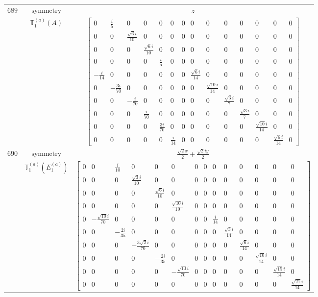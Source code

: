 \documentclass[fleqn,8pt,landscape]{jsarticle}
\begin{document}
\begin{longtable}{ccc}
$ 689 $ & $ \text{symmetry} $ & $ z $ \\
$  $ & $ \mathbb{T}_{1}^{(a)}(A) $ & $ \begin{bmatrix} 0 & \frac{i}{5} & 0 & 0 & 0 & 0 & 0 & 0 & 0 & 0 & 0 & 0 & 0 & 0 \\ 0 & 0 & \frac{\sqrt{6} i}{10} & 0 & 0 & 0 & 0 & 0 & 0 & 0 & 0 & 0 & 0 & 0 \\ 0 & 0 & 0 & \frac{\sqrt{6} i}{10} & 0 & 0 & 0 & 0 & 0 & 0 & 0 & 0 & 0 & 0 \\ 0 & 0 & 0 & 0 & \frac{i}{5} & 0 & 0 & 0 & 0 & 0 & 0 & 0 & 0 & 0 \\ - \frac{i}{14} & 0 & 0 & 0 & 0 & 0 & 0 & \frac{\sqrt{6} i}{14} & 0 & 0 & 0 & 0 & 0 & 0 \\ 0 & - \frac{3 i}{70} & 0 & 0 & 0 & 0 & 0 & 0 & \frac{\sqrt{10} i}{14} & 0 & 0 & 0 & 0 & 0 \\ 0 & 0 & - \frac{i}{70} & 0 & 0 & 0 & 0 & 0 & 0 & \frac{\sqrt{3} i}{7} & 0 & 0 & 0 & 0 \\ 0 & 0 & 0 & \frac{i}{70} & 0 & 0 & 0 & 0 & 0 & 0 & \frac{\sqrt{3} i}{7} & 0 & 0 & 0 \\ 0 & 0 & 0 & 0 & \frac{3 i}{70} & 0 & 0 & 0 & 0 & 0 & 0 & \frac{\sqrt{10} i}{14} & 0 & 0 \\ 0 & 0 & 0 & 0 & 0 & \frac{i}{14} & 0 & 0 & 0 & 0 & 0 & 0 & \frac{\sqrt{6} i}{14} & 0 \end{bmatrix} $ \\ \hline
$ 690 $ & $ \text{symmetry} $ & $ \frac{\sqrt{2} x}{2} + \frac{\sqrt{2} i y}{2} $ \\
$  $ & $ \mathbb{T}_{1}^{(a)}(E_{1}^{(a)}) $ & $ \begin{bmatrix} 0 & 0 & \frac{i}{10} & 0 & 0 & 0 & 0 & 0 & 0 & 0 & 0 & 0 & 0 & 0 \\ 0 & 0 & 0 & \frac{\sqrt{3} i}{10} & 0 & 0 & 0 & 0 & 0 & 0 & 0 & 0 & 0 & 0 \\ 0 & 0 & 0 & 0 & \frac{\sqrt{6} i}{10} & 0 & 0 & 0 & 0 & 0 & 0 & 0 & 0 & 0 \\ 0 & 0 & 0 & 0 & 0 & \frac{\sqrt{10} i}{10} & 0 & 0 & 0 & 0 & 0 & 0 & 0 & 0 \\ 0 & - \frac{\sqrt{10} i}{70} & 0 & 0 & 0 & 0 & 0 & 0 & \frac{i}{14} & 0 & 0 & 0 & 0 & 0 \\ 0 & 0 & - \frac{2 i}{35} & 0 & 0 & 0 & 0 & 0 & 0 & \frac{\sqrt{3} i}{14} & 0 & 0 & 0 & 0 \\ 0 & 0 & 0 & - \frac{3 \sqrt{2} i}{70} & 0 & 0 & 0 & 0 & 0 & 0 & \frac{\sqrt{6} i}{14} & 0 & 0 & 0 \\ 0 & 0 & 0 & 0 & - \frac{2 i}{35} & 0 & 0 & 0 & 0 & 0 & 0 & \frac{\sqrt{10} i}{14} & 0 & 0 \\ 0 & 0 & 0 & 0 & 0 & - \frac{\sqrt{10} i}{70} & 0 & 0 & 0 & 0 & 0 & 0 & \frac{\sqrt{15} i}{14} & 0 \\ 0 & 0 & 0 & 0 & 0 & 0 & 0 & 0 & 0 & 0 & 0 & 0 & 0 & \frac{\sqrt{21} i}{14} \end{bmatrix} $ \\ \hline

\end{longtable}
\end{document}
